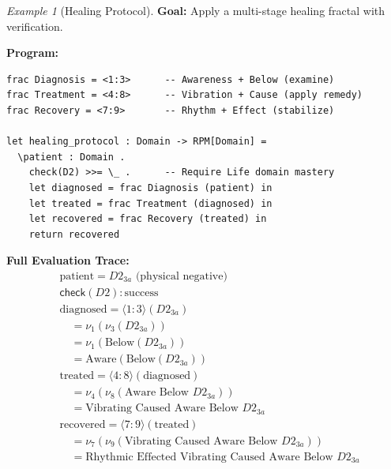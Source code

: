 \documentclass[11pt,twoside,openright]{book}
\theoremstyle{definition}
\theoremstyle{plain}
\theoremstyle{remark}
\newtheorem{example}[definition]{Example}
\newcommand{\noe}[1]{\nu_{#1}}
\begin{document}
\begin{example}[Healing Protocol]
\label{ex:healing-protocol}
\textbf{Goal:} Apply a multi-stage healing fractal with verification.

\textbf{Program:}
\begin{verbatim}
frac Diagnosis = <1:3>      -- Awareness + Below (examine)
frac Treatment = <4:8>      -- Vibration + Cause (apply remedy)
frac Recovery = <7:9>       -- Rhythm + Effect (stabilize)

let healing_protocol : Domain -> RPM[Domain] =
  \patient : Domain .
    check(D2) >>= \_ .      -- Require Life domain mastery
    let diagnosed = frac Diagnosis (patient) in
    let treated = frac Treatment (diagnosed) in
    let recovered = frac Recovery (treated) in
    return recovered
\end{verbatim}

\textbf{Full Evaluation Trace:}
\begin{align}
&\text{patient} = D2_{3a} \text{ (physical negative)} \\
&\mathsf{check}(D2): \text{success} \\
&\text{diagnosed} = \langle 1:3 \rangle(D2_{3a}) \\
&\quad = \noe{1}(\noe{3}(D2_{3a})) \\
&\quad = \noe{1}(\text{Below}(D2_{3a})) \\
&\quad = \text{Aware}(\text{Below}(D2_{3a})) \\
&\text{treated} = \langle 4:8 \rangle(\text{diagnosed}) \\
&\quad = \noe{4}(\noe{8}(\text{Aware Below } D2_{3a})) \\
&\quad = \text{Vibrating Caused Aware Below } D2_{3a} \\
&\text{recovered} = \langle 7:9 \rangle(\text{treated}) \\
&\quad = \noe{7}(\noe{9}(\text{Vibrating Caused Aware Below } D2_{3a})) \\
&\quad = \text{Rhythmic Effected Vibrating Caused Aware Below } D2_{3a}
\end{align}
\end{example}
\end{document}
